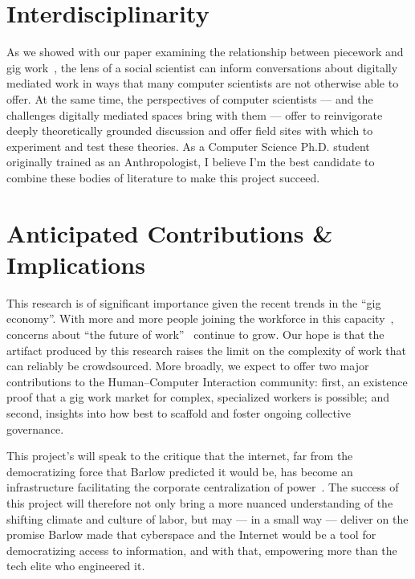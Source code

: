\documentclass[10pt]{article}
\newcommand{\topic}[1]{{\color{Blue}#1}}
\renewcommand{\topic}[1]{{#1}}
\begin{document}
\section*{Interdisciplinarity}
As we showed with our paper examining the relationship between piecework and gig work~\cite{pieceworkCrowdworkGigwork},
the lens of a social scientist can inform conversations about digitally mediated work in ways that many computer scientists are not otherwise able to offer.
At the same time, the perspectives of computer scientists
--- and the challenges digitally mediated spaces bring with them ---
offer to reinvigorate deeply theoretically grounded discussion and offer field sites with which to experiment and test these theories.
As a Computer Science Ph.D. student originally trained as an Anthropologist, I believe
I'm the best candidate to combine these bodies of literature to make this project succeed.










\section*{Anticipated Contributions \& Implications}
This research is of significant importance given the recent trends in the ``gig economy''.
With more and more people joining the workforce in this capacity~\cite{pewSharing,pewSharing24percent},
concerns about ``the future of work''~\cite{waterCooler,crowdworkFuture} continue to grow.
Our hope is that the artifact produced by this research raises the limit on the complexity of work that can reliably be crowdsourced.
More broadly, we expect to offer two major contributions to the Human--Computer Interaction community:
first, an existence proof that a gig work market for complex, specialized workers is possible; and
second, insights into how best to scaffold and foster ongoing collective governance.

This project's will speak to the critique that the internet,
far from the democratizing force that Barlow predicted it would be,
has become an infrastructure facilitating the corporate centralization of power~\cite{barlow2009declaration,jones2011does,EboCybertopia}.
The success of this project will therefore not only
bring a more nuanced understanding of the shifting climate and culture of labor,
but may
--- in a small way ---
deliver on the promise Barlow made that
cyberspace and the Internet would be a tool for democratizing access to information, and with that,
empowering more than the tech elite who engineered it.

\pagebreak
\printbibliography{}
\end{document}
